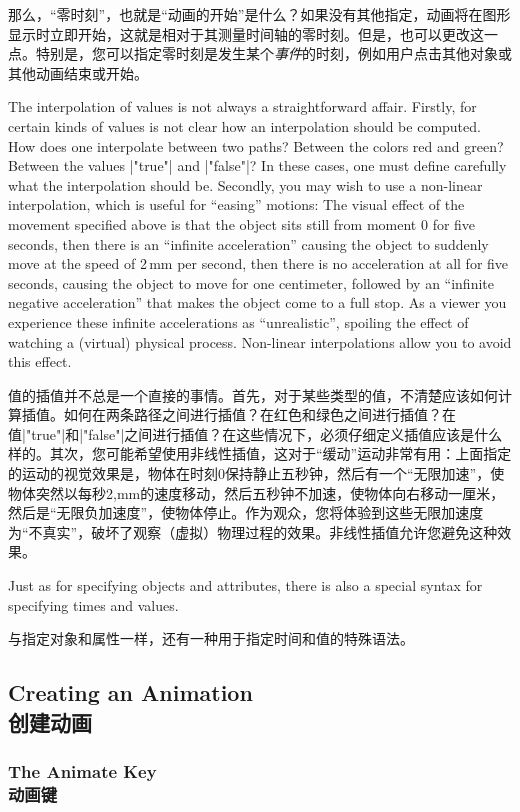 那么，“零时刻”，也就是“动画的开始”是什么？如果没有其他指定，动画将在图形显示时立即开始，这就是相对于其测量时间轴的零时刻。但是，也可以更改这一点。特别是，您可以指定零时刻是发生某个\emph{事件}的时刻，例如用户点击其他对象或其他动画结束或开始。

The interpolation of values is not always a straightforward affair. Firstly,
for certain kinds of values is not clear how an interpolation should be
computed. How does one interpolate between two paths? Between the colors red
and green? Between the values |"true"| and |"false"|? In these cases, one must
define carefully what the interpolation should be. Secondly, you may wish to
use a non-linear interpolation, which is useful for ``easing'' motions: The
visual effect of the movement specified above is that the object sits still
from moment $0$ for five seconds, then there is an ``infinite acceleration''
causing the object to suddenly move at the speed of 2\,mm per second, then
there is no acceleration at all for five seconds, causing the object to move
for one centimeter, followed by an ``infinite negative acceleration'' that
makes the object come to a full stop. As a viewer you experience these infinite
accelerations as ``unrealistic'', spoiling the effect of watching a (virtual)
physical process. Non-linear interpolations allow you to avoid this effect.

值的插值并不总是一个直接的事情。首先，对于某些类型的值，不清楚应该如何计算插值。如何在两条路径之间进行插值？在红色和绿色之间进行插值？在值|"true"|和|"false"|之间进行插值？在这些情况下，必须仔细定义插值应该是什么样的。其次，您可能希望使用非线性插值，这对于“缓动”运动非常有用：上面指定的运动的视觉效果是，物体在时刻$0$保持静止五秒钟，然后有一个“无限加速”，使物体突然以每秒2,mm的速度移动，然后五秒钟不加速，使物体向右移动一厘米，然后是“无限负加速度”，使物体停止。作为观众，您将体验到这些无限加速度为“不真实”，破坏了观察（虚拟）物理过程的效果。非线性插值允许您避免这种效果。

Just as for specifying objects and attributes, there is also a special syntax
for specifying times and values.

与指定对象和属性一样，还有一种用于指定时间和值的特殊语法。


\subsection{Creating an Animation\\创建动画}

\subsubsection{The Animate Key\\动画键}

